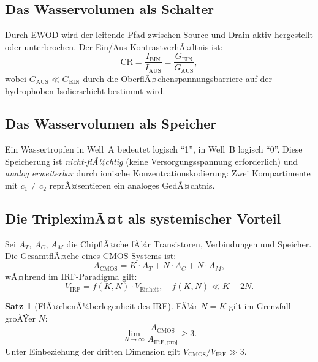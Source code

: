﻿\documentclass[a4paper,12pt]{scrreprt}
\theoremstyle{definition}
\newtheorem{satz}{Satz}[section]
\begin{document}
\subsection{Das Wasservolumen als Schalter}

Durch EWOD wird der leitende Pfad zwischen Source und Drain aktiv hergestellt
oder unterbrochen. Der Ein/Aus-KontrastverhÃ¤ltnis ist:
\begin{equation}
  \mathrm{CR} = \frac{I_{\mathrm{EIN}}}{I_{\mathrm{AUS}}} = \frac{G_{\mathrm{EIN}}}{G_{\mathrm{AUS}}},
\end{equation}
wobei $G_{\mathrm{AUS}} \ll G_{\mathrm{EIN}}$ durch die OberflÃ¤chenspannungsbarriere
auf der hydrophoben Isolierschicht bestimmt wird.

\subsection{Das Wasservolumen als Speicher}

Ein Wassertropfen in Well~A bedeutet logisch ``1'', in Well~B logisch ``0''.
Diese Speicherung ist \emph{nicht-flÃ¼chtig} (keine Versorgungsspannung
erforderlich) und \emph{analog erweiterbar} durch ionische Konzentrations\-kodierung:
Zwei Kompartimente mit $c_1 \neq c_2$ reprÃ¤sentieren ein analoges GedÃ¤chtnis.

\subsection{Die TripleximÃ¤t als systemischer Vorteil}

Sei $A_T$, $A_C$, $A_M$ die ChipflÃ¤che fÃ¼r Transistoren, Verbindungen und
Speicher. Die GesamtflÃ¤che eines CMOS-Systems ist:
\begin{equation}
  A_{\mathrm{CMOS}} = K \cdot A_T + N \cdot A_C + N \cdot A_M,
\end{equation}
wÃ¤hrend im IRF-Paradigma gilt:
\begin{equation}
  V_{\mathrm{IRF}} = f(K, N) \cdot V_{\mathrm{Einheit}}, \quad f(K,N) \ll K + 2N.
\end{equation}

\begin{satz}[FlÃ¤chenÃ¼berlegenheit des IRF]
  FÃ¼r $N = K$ gilt im Grenzfall groÃŸer $N$:
  \begin{equation}
    \lim_{N\to\infty} \frac{A_{\mathrm{CMOS}}}{A_{\mathrm{IRF,proj}}} \geq 3.
  \end{equation}
  Unter Einbeziehung der dritten Dimension gilt $V_{\mathrm{CMOS}}/V_{\mathrm{IRF}} \gg 3$.
\end{satz}
\end{document}
